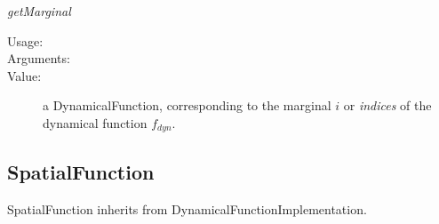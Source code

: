 \begin{description}
\begin{description}
\item \textit{getMarginal}
\begin{description}
\item[Usage:] \rule{0pt}{1em}
\item[Arguments:] \rule{0pt}{1em}
\item[Value:] a DynamicalFunction, corresponding to the marginal $i$ or \textit{indices} of the dynamical function $f_{dyn}$.
\end{description}
\end{description}
\end{description}

\newpage

\subsection{SpatialFunction}



SpatialFunction inherits from DynamicalFunctionImplementation.

